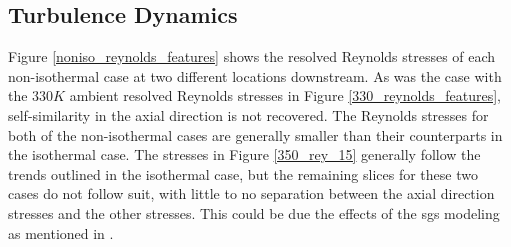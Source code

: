 \subsection{Turbulence Dynamics}
Figure \ref{noniso_reynolds_features} shows the resolved Reynolds stresses of each non-isothermal case at two different locations downstream. As was the case with the $330 K$ ambient resolved Reynolds stresses in Figure \ref{330_reynolds_features}, self-similarity in the axial direction is not recovered. The Reynolds stresses for both of the non-isothermal cases are generally smaller than their counterparts in the isothermal case. The stresses in Figure \ref{350_rey_15} generally follow the trends outlined in the isothermal case, but the remaining slices for these two cases do not follow suit, with little to no separation between the axial direction stresses and the other stresses. This could be due the effects of the \gls{sgs} modeling as mentioned in \cite{doi:10.1063/1.4937948}.  

